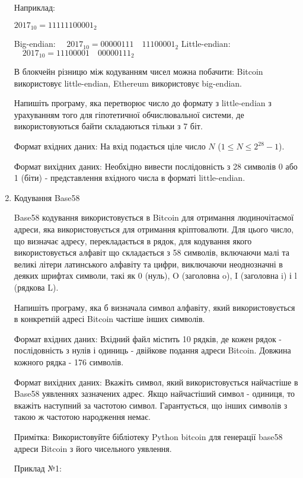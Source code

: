 \documentclass[]{article}
\begin{document}
\begin{enumerate}
Наприклад: 

$2017_{10} = 11111100001_{2}$

Big-endian: $ \quad 2017_{10} = 00000111 \quad 11100001_{2}$
Little-endian:$ \quad 2017_{10} = 11100001\quad 00000111_{2} $

В блокчейн різницю між кодуванням чисел можна побачити: Bitcoin використовує little-endian, Ethereum використовує big-endian.

Напишіть програму, яка перетворює число до формату з little-endian з урахуванням того для гіпотетичної обчислювальної системи, де використовуються байти складаються тільки з 7 біт.

Формат вхідних даних:
На вхід подається ціле число $N $ ($1\le N \le 2^{28}-1 $).

Формат вихідних даних:
Необхідно вивести послідовність з 28 символів 0 або 1 (біти) - представлення вхідного числа в форматі little-endian.

\item
Кодування Base58

Base58 кодування використовується в Bitcoin для отримання людиночітаємої адреси, яка використовується для отримання
кріптовалюти. Для цього число, що визначає адресу, перекладається в рядок, для кодування якого використовується алфавіт
що складається з 58 символів, включаючи малі та великі літери латинського алфавіту та цифри, виключаючи неоднозначні в
деяких шрифтах символи, такі як 0 (нуль), O (заголовна o), I (заголовна i) і l (рядкова L).

Напишіть програму, яка б визначала символ алфавіту, який використовується в конкретній адресі Bitcoin частіше
інших символів.

Формат вхідних даних:
Вхідний файл містить 10 рядків, де кожен рядок - послідовність з нулів і одиниць - двійкове подання адреси Bitcoin. Довжина кожного рядка - 176 символів.

Формат вихідних даних:
Вкажіть символ, який використовується найчастіше в Base58 уявленнях зазначених адрес. Якщо найчастіший символ -
одиниця, то вкажіть наступний за частотою символ. Гарантується, що інших символів з такою ж частотою народження
немає.

Примітка:
Використовуйте бібліотеку Python bitcoin для генерації base58 адреси Bitcoin з його чисельного уявлення.

Приклад №1:


\end{enumerate}
\end{document}
